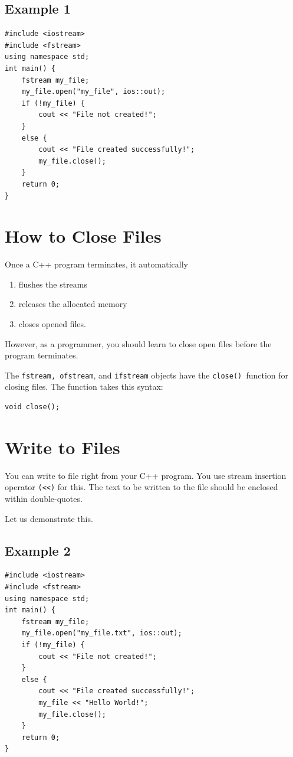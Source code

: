 \documentclass{book}
\begin{document}
\subsection{Example 1}

\begin{lstlisting}
#include <iostream>
#include <fstream>
using namespace std;
int main() {
	fstream my_file;
	my_file.open("my_file", ios::out);
	if (!my_file) {
		cout << "File not created!";
	}
	else {
		cout << "File created successfully!";
		my_file.close(); 
	}
	return 0;
}
\end{lstlisting}

\section{How to Close Files}

Once a C++ program terminates, it automatically

\begin{enumerate}
	\item flushes the streams
\item releases the allocated memory
\item closes opened files.
\end{enumerate}

However, as a programmer, you should learn to close open files before the program terminates.

The \texttt{fstream, ofstream}, and \texttt{ifstream} objects have the \texttt{close() }function for closing files. The function takes this syntax:

\begin{lstlisting}
void close();
\end{lstlisting}

\section{Write to Files}

You can write to file right from your C++ program. You use stream insertion operator \texttt{(<<)} for this. The text to be written to the file should be enclosed within double-quotes.

Let us demonstrate this.

\subsection{Example 2}

\begin{lstlisting}
#include <iostream>
#include <fstream>
using namespace std;
int main() {
	fstream my_file;
	my_file.open("my_file.txt", ios::out);
	if (!my_file) {
		cout << "File not created!";
	}
	else {
		cout << "File created successfully!";
		my_file << "Hello World!";
		my_file.close();
	}
	return 0;
}
\end{lstlisting}
\end{document}
